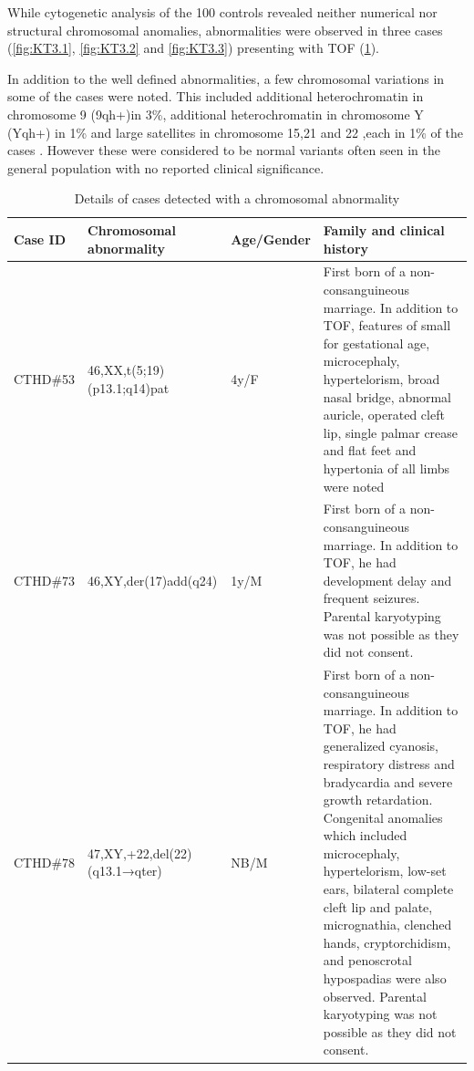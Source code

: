 \begin{refsection}
While cytogenetic analysis of the 100 controls revealed neither numerical nor structural chromosomal anomalies, abnormalities were observed in three cases (\cref{fig:KT3.1}, \cref{fig:KT3.2} and \cref{fig:KT3.3}) presenting with TOF (\cref{tab:3.1abnormalkt}).

In addition to the well defined abnormalities, a few chromosomal variations in some of the cases were noted. This included additional heterochromatin in chromosome 9 (9qh+)in 3\%, additional heterochromatin in chromosome Y (Yqh+) in 1\% and large satellites in chromosome 15,21 and 22 ,each in 1\% of the cases . However these were considered to be normal variants often seen in the general population with no reported clinical significance.

\begin{landscape}
\begin{table}[!p]
\centering
\caption[Details of cases with a chromosomal abnormality]{Details of cases detected with a chromosomal abnormality}
\label{tab:3.1abnormalkt}
\begin{tabular}{p{0.75in}  p{2.15in}  p{0.75in}  p{5in}  }
\toprule
	\textbf{Case ID} & \textbf{Chromosomal abnormality} &  \textbf{Age/Gender} &  \textbf{Family and clinical history} \\ \toprule
	CTHD\#53 & 46,XX,t(5;19)(p13.1;q14)pat & 4y/F & First born of a non-consanguineous marriage. In addition to TOF, features of small for gestational age, microcephaly, hypertelorism, broad nasal bridge, abnormal auricle, operated cleft lip, single palmar crease and flat feet and hypertonia of all limbs were noted   \\ \midrule
	CTHD\#73 & 46,XY,der(17)add(q24) & 1y/M & First born of a non-consanguineous marriage. In addition to TOF, he had development delay and frequent seizures. Parental karyotyping was not possible as they did not consent. \\ \midrule
	CTHD\#78 & 47,XY,+22,del(22)(q13.1→qter) & NB/M & First born of a non-consanguineous marriage. In addition to TOF, he had generalized cyanosis, respiratory distress and bradycardia and severe growth retardation. Congenital anomalies which included microcephaly, hypertelorism, low-set ears, bilateral complete cleft lip and palate, micrognathia, clenched hands, cryptorchidism, and penoscrotal hypospadias were also observed. Parental karyotyping was not possible as they did not consent. \\ \bottomrule
	
\end{tabular}
\end{table}
\end{landscape}


\end{refsection}
